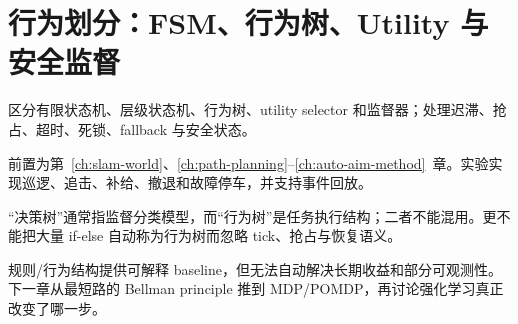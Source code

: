 \chapter{行为划分：FSM、行为树、Utility 与安全监督}
\label{ch:behavior}

\begin{learningobjectives}
区分有限状态机、层级状态机、行为树、utility selector 和监督器；处理迟滞、抢占、超时、死锁、fallback 与安全状态。
\end{learningobjectives}

\begin{prerequisites}
前置为第~\ref{ch:slam-world}、\ref{ch:path-planning}--\ref{ch:auto-aim-method}~章。实验实现巡逻、追击、补给、撤退和故障停车，并支持事件回放。
\end{prerequisites}


\begin{failuremode}
“决策树”通常指监督分类模型，而“行为树”是任务执行结构；二者不能混用。更不能把大量 if-else 自动称为行为树而忽略 tick、抢占与恢复语义。
\end{failuremode}

\begin{chaptertransition}
规则/行为结构提供可解释 baseline，但无法自动解决长期收益和部分可观测性。下一章从最短路的 Bellman principle 推到 MDP/POMDP，再讨论强化学习真正改变了哪一步。
\end{chaptertransition}

